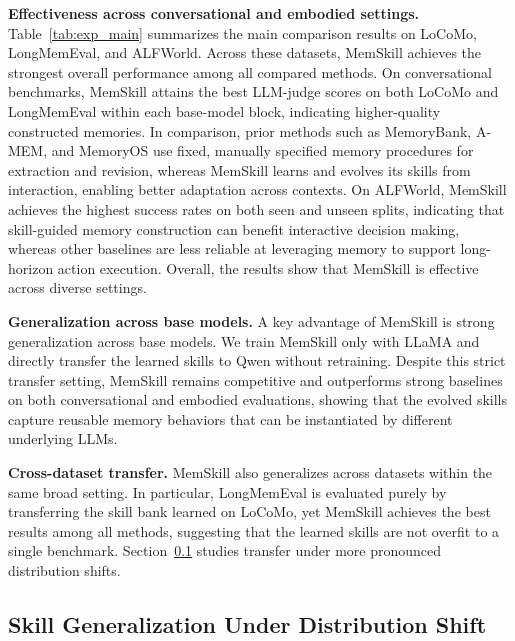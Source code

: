 \textbf{Effectiveness across conversational and embodied settings.}
Table~\ref{tab:exp_main} summarizes the main comparison results on LoCoMo, LongMemEval, and ALFWorld. Across these datasets, MemSkill achieves the strongest overall performance among all compared methods. On conversational benchmarks, MemSkill attains the best LLM-judge scores on both LoCoMo and LongMemEval within each base-model block, indicating higher-quality constructed memories. 
In comparison, prior methods such as MemoryBank, A-MEM, and MemoryOS use fixed, manually specified memory procedures for extraction and revision, whereas MemSkill learns and evolves its skills from interaction, enabling better adaptation across contexts.
On ALFWorld, MemSkill achieves the highest success rates on both seen and unseen splits, indicating that skill-guided memory construction can benefit interactive decision making, whereas other baselines are less reliable at leveraging memory to support long-horizon action execution.
Overall, the results show that MemSkill is effective across diverse settings.





\textbf{Generalization across base models.}
A key advantage of MemSkill is strong generalization across base models. We train MemSkill only with LLaMA and directly transfer the learned skills to Qwen without retraining. Despite this strict transfer setting, MemSkill remains competitive and outperforms strong baselines on both conversational and embodied evaluations, showing that the evolved skills capture reusable memory behaviors that can be instantiated by different underlying LLMs.


\textbf{Cross-dataset transfer.}
MemSkill also generalizes across datasets within the same broad setting. In particular, LongMemEval is evaluated purely by transferring the skill bank learned on LoCoMo, yet MemSkill achieves the best results among all methods, suggesting that the learned skills are not overfit to a single benchmark. Section~\ref{sec:exp_shift} studies transfer under more pronounced distribution shifts.










\subsection{Skill Generalization Under Distribution Shift}
\label{sec:exp_shift}



